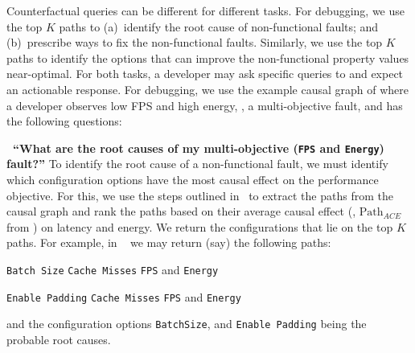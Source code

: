 Counterfactual queries can be different for different tasks. For debugging, we use the top $K$ paths to (a)~identify the root cause of non-functional faults; and (b)~prescribe ways to fix the non-functional faults. Similarly, we use the top $K$ paths to identify the options that can improve the non-functional property values near-optimal.
For both tasks, a developer may ask specific queries to \ourapproach and expect an actionable response. For debugging, we use the example causal graph of where a developer observes low FPS and high energy, \ie, a multi-objective fault, and has the following questions:  %

\noindent\textbf{\faQuestionCircle~\textbf{``What are the root causes of my multi-objective (\texttt{FPS} and \texttt{Energy}) fault?''}} To identify the root cause of a non-functional fault, we must identify which configuration options have the most causal effect on the performance objective. %
For this, we use the steps outlined in~ to extract the paths from the causal graph and rank the paths based on their average causal effect (\ie, $\mathrm{Path}_{ACE}$ from ) on latency and energy. We return the configurations that lie on the top $K$ paths. 
For example, in ~ we may return (say) the following paths: 
\bisq
\small
    \item  \texttt{Batch Size} \edgeone \texttt{Cache Misses} \edgeone \texttt{FPS} and \texttt{Energy}
    \item  \texttt{Enable Padding}  \edgeone \texttt{Cache Misses}  \edgeone \texttt{FPS} and \texttt{Energy}
\ei
 
and the configuration options {\texttt{BatchSize}, and \texttt{Enable Padding}} being the probable root causes.

